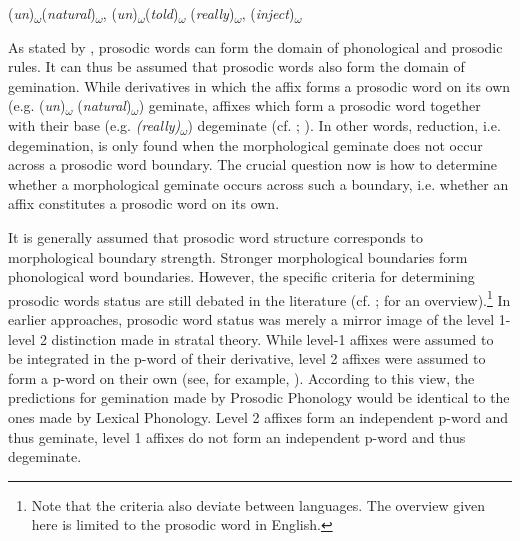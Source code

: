 \begin{multicols}{2}

\begin{exe}
		\centering	
	\ex (\textit{un})\textsubscript{$\omega$}(\textit{natural})\textsubscript{$\omega$}, (\textit{un})\textsubscript{$\omega$}(\textit{told})\textsubscript{$\omega$}
\columnbreak
	\ex (\textit{really})\textsubscript{$\omega$}, (\textit{inject})\textsubscript{$\omega$}
\end{exe}

\end{multicols}



As stated by \citet[3]{Hall.2001}, prosodic words can form the domain of phonological and prosodic rules. It can thus be assumed that prosodic words also form the domain of gemination. While derivatives in which the affix forms a prosodic word on its own (e.g. (\textit{un})\textsubscript{$\omega$} (\textit{natural})\textsubscript{$\omega$}) geminate, affixes which form a prosodic word together with their base (e.g. \textit{(really)}\textsubscript{$\omega$}) degeminate (cf. \citealt[3543]{Giegerich.2012}; \citealt{Bergmann.}). In other words, reduction, i.e. degemination, is only found when the morphological geminate does not occur across a prosodic word boundary. The crucial question now is how to determine whether a morphological geminate occurs across such a boundary, i.e. whether an affix constitutes a prosodic word on its own.




It is generally assumed that prosodic word structure corresponds to morphological boundary strength. Stronger morphological boundaries form phonological word boundaries. However, the specific criteria for determining prosodic words status are still debated in the literature (cf. \citealt{Raffelsiefen.1999}; \citealt{Hall.2001} for an overview).\footnote{Note that the criteria also deviate between languages. The overview given here is limited to the prosodic word in English.} 
In earlier approaches, prosodic word status was merely a mirror image of the level 1-level 2 distinction made in stratal theory. While level-1 affixes were assumed to be integrated in the p-word of their derivative, level 2 affixes were assumed to form a p-word on their own (see, for example, \citealt{Aronoff.1983,Booij.1983b,Szpyra.1989}). According to this view, the predictions for gemination made by Prosodic Phonology would be identical to the ones made by Lexical Phonology. Level 2 affixes form an independent p-word and thus geminate, level 1 affixes do not form an independent p-word and thus degeminate. 

